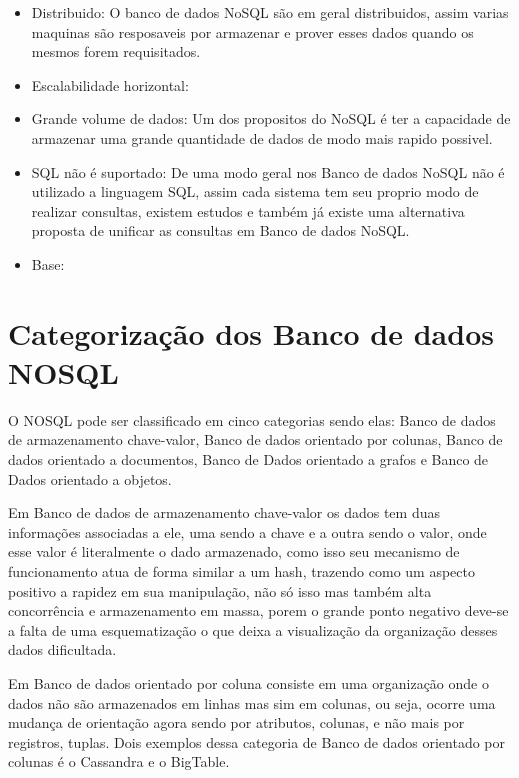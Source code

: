 \documentclass[12pt]{article}
\begin{document}
\begin{itemize}
	\item Distribuido: O banco de dados NoSQL são em geral distribuidos, assim varias maquinas são resposaveis por armazenar e prover esses dados quando os mesmos forem requisitados.\\
	\item Escalabilidade horizontal:  \\
	\item Grande volume de dados: Um dos propositos do NoSQL é ter a capacidade de armazenar uma grande quantidade de dados de modo mais rapido possivel.\\
	\item SQL não é suportado: De uma modo geral nos Banco de dados NoSQL não é utilizado a linguagem SQL, assim cada sistema tem seu proprio modo de realizar consultas, existem estudos e também já existe uma alternativa proposta de unificar as consultas em Banco de dados NoSQL.\\
	\item Base: \\
\end{itemize}

\section{Categorização dos Banco de dados NOSQL}
\label{sec:categorizacao}

O NOSQL pode ser classificado em cinco categorias \cite{typeNOSQL:2013} sendo elas: Banco de dados de armazenamento chave-valor, Banco de dados orientado por colunas, Banco de dados orientado a documentos, Banco de Dados orientado a grafos e Banco de Dados orientado a objetos.

Em Banco de dados de armazenamento chave-valor os dados tem duas informações associadas a ele, uma sendo a chave e a outra sendo o valor, onde esse valor é literalmente o dado armazenado, como isso seu mecanismo de funcionamento atua de forma similar a um hash, trazendo como um aspecto positivo a rapidez em sua manipulação, não só isso mas também alta concorrência e armazenamento em massa, porem o grande ponto negativo deve-se a falta de uma esquematização o que deixa a visualização da organização desses dados dificultada.\cite{typeNOSQL:2013}

Em Banco de dados orientado por coluna consiste em uma organização onde o dados não são armazenados em linhas mas sim em colunas, ou seja, ocorre uma mudança de orientação agora sendo por atributos, colunas, e não mais por registros, tuplas. Dois exemplos dessa categoria de Banco de dados orientado por colunas é o Cassandra e o BigTable.\cite{brito2010bancos}\cite{surveyNosql:2012}
\end{document}
